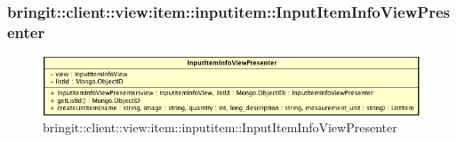 \subsubsection{bringit::client::view:item::inputitem::InputItemInfoViewPresenter}

\label{bringit::client::view:item::inputitem::InputItemInfoViewPresenter}
\begin{figure}[H]
	\centering
	\includegraphics[scale=0.5]{Sezioni/SottosezioniST/img/app/InputItemInfoViewPresenter.png}
	\caption{bringit::client::view:item::inputitem::InputItemInfoViewPresenter}
\end{figure}

